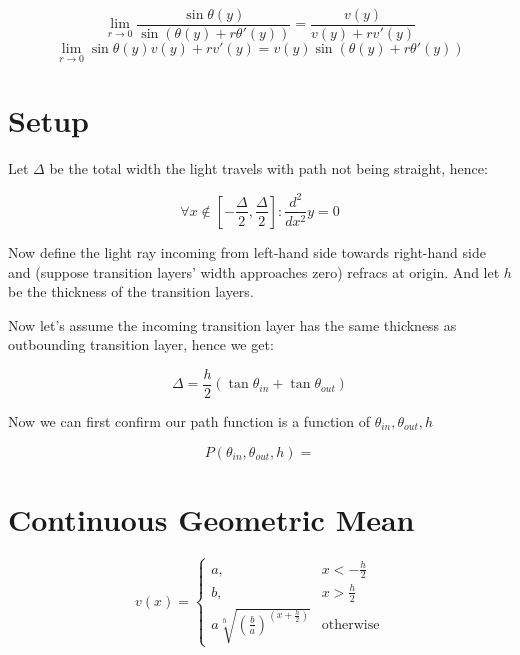 \documentclass[preprint]{ptephy_v1}%
\begin{document}
\begin{equation}
    \lim_{r\to 0}
    \frac{\sin\theta(y)}{\sin\left(\theta(y)+r\theta'(y)\right)}=
    \frac{v(y)}{v(y)+rv'(y)}
\end{equation}
\begin{equation}
    \lim_{r\to 0}
    {\sin\theta(y)}{v(y)+rv'(y)}=
    {v(y)}{\sin\left(\theta(y)+r\theta'(y)\right)}
\end{equation}

\newpage

\section{Setup}

Let $\Delta$ be the total width the light travels with path not being straight, hence:

\begin{equation}
\forall x\notin[-\frac{\Delta}{2}, \frac{\Delta}{2}]: \frac{d^2}{dx^2}y=0
\end{equation}

Now define the light ray incoming from left-hand side towards right-hand side and (suppose transition layers' width approaches zero) refracs at origin. And let $h$ be the thickness of the transition layers.

Now let's assume the incoming transition layer has the same thickness as outbounding transition layer, hence we get:

\begin{equation}
\Delta=\frac{h}{2}(\tan\theta_{in}+\tan\theta_{out})
\end{equation}

Now we can first confirm our path function is a function of $\theta_{in}, \theta_{out}, h$

\begin{equation}
P(\theta_{in}, \theta_{out}, h)=
\end{equation}

\section{Continuous Geometric Mean}
\begin{equation}
v(x)=
\begin{cases}
a, & x<-\frac{h}{2} \\
b, & x>\frac{h}{2} \\
a\sqrt[h]{(\frac{b}{a})^{\left(x+\frac{h}{2}\right)}} & \text{otherwise}
\end{cases}
\end{equation}
\end{document}
